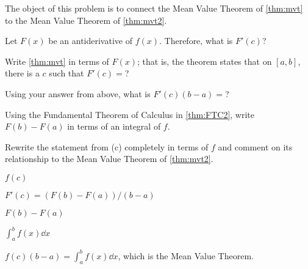 {The object of this problem is to connect the Mean Value Theorem of \autoref{thm:mvt} to the Mean Value Theorem of \autoref{thm:mvt2}.
\begin{enumext}[start=1]
\item		Let $F(x)$ be an antiderivative of $f(x)$. Therefore, what is $F'(c)$?
\item		Write \autoref{thm:mvt} in terms of $F(x)$; that is, the theorem states that on $[a,b]$, there is a $c$ such that $F'(c) = $?
\item		Using your answer from above, what is $F'(c)(b-a)=$?
\item		Using the Fundamental Theorem of Calculus in \autoref{thm:FTC2}, write $F(b) -F(a)$ in terms of an integral of $f$.
\item		Rewrite the statement from (c) completely in terms of $f$ and comment on its relationship to the Mean Value Theorem of \autoref{thm:mvt2}.
\end{enumext}
}
{\begin{enumext}[start=1]
\item		$f(c)$
\item		$F'(c) = (F(b)-F(a))/(b-a)$
\item		$F(b) - F(a)$
\item		$\int_a^b f(x) \dd x$
\item		$f(c)(b-a) = \int_a^b f(x)\dd x$, which is the Mean Value Theorem.
\end{enumext}
}

